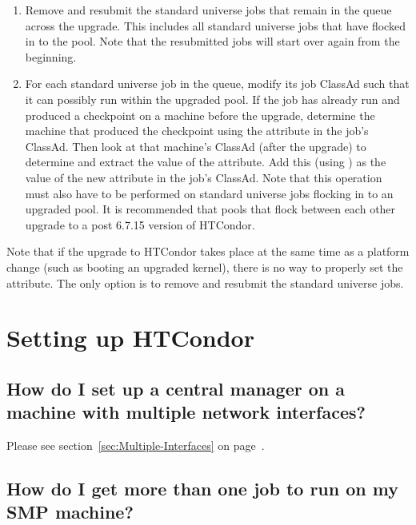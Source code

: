 \begin{enumerate}
  \item Remove and resubmit the standard universe jobs that
  remain in the queue across the upgrade. 
  This includes all standard universe jobs that have flocked in to 
  the pool.
  Note that the resubmitted jobs will start over again from the beginning.

  \item For each standard universe job in the queue,
  modify its job ClassAd such that it can possibly run within the
  upgraded pool.
  If the job has already run and produced a checkpoint on a machine
  before the upgrade, determine the machine that produced the checkpoint
  using the  attribute
  in the job's ClassAd.
  Then look at that machine's ClassAd (after the upgrade) to
  determine and extract the value of the  attribute.
  Add this (using ) as the value of the 
  new attribute  in the job's ClassAd.
  Note that this operation must also have to be performed on standard
  universe jobs flocking in to an upgraded pool. 
  It is recommended that pools that flock between each other upgrade to a
  post 6.7.15 version of HTCondor.
\end{enumerate}

Note that if the upgrade to HTCondor takes place at the same time
as a platform change (such as booting an upgraded kernel),
there is no way to properly set the  attribute.
The only option is to remove and resubmit the standard universe jobs.

\section{Setting up HTCondor}

\subsection*{How do I set up a central manager on a machine with multiple network interfaces?}

Please see section~\ref{sec:Multiple-Interfaces} on 
page~\pageref{sec:Multiple-Interfaces}.

\subsection*{How do I get more than one job to run on my SMP machine?}

